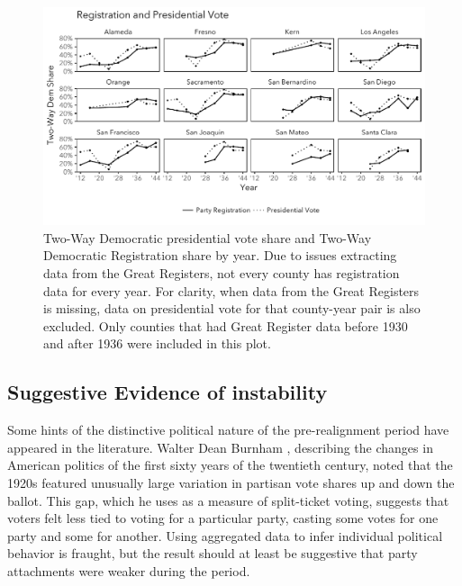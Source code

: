 \documentclass[11pt]{scrartcl}\usepackage[]{graphicx}\usepackage[]{color}
\makeatletter
\def\maxwidth{ %
  \ifdim\Gin@nat@width>\linewidth
    \linewidth
  \else
    \Gin@nat@width
  \fi
}
\newenvironment{knitrout}{}{} %
\makeatother
\begin{document}

\begin{knitrout}
\color{fgcolor}\begin{figure}

{\centering \includegraphics[width=\maxwidth]{figures/plots-countyparty-1} 

}

\caption[Two-Way Democratic presidential vote share and Two-Way Democratic Registration share by year]{Two-Way Democratic presidential vote share and Two-Way Democratic Registration share by year. Due to issues extracting data from the Great Registers, not every county has registration data for every year. For clarity, when data from the Great Registers is missing, data on presidential vote for that county-year pair is also excluded. Only counties that had Great Register data before 1930 and after 1936 were included in this plot.}\label{fig:countyparty}
\end{figure}


\end{knitrout}


\FloatBarrier
\subsection*{Suggestive Evidence of instability}

Some hints of the distinctive political nature of the pre-realignment period have appeared in the literature.  Walter Dean Burnham \citeyearpar{burnham1965changing}, describing the changes in American politics of the first sixty years of the twentieth century, noted that the 1920s featured unusually large variation in partisan vote shares up and down the ballot.  This gap, which he uses as a measure of split-ticket voting, suggests that voters felt less tied to voting for a particular party, casting some votes for one party and some for another. Using aggregated data to infer individual political behavior is fraught, but the result should at least be suggestive that party attachments were weaker during the period.
\end{document}
